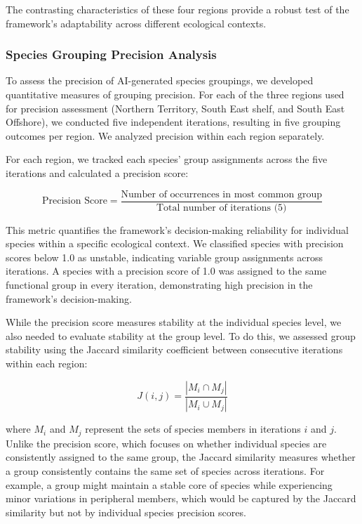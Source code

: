 The contrasting characteristics of these four regions provide a robust test of the framework's adaptability across different ecological contexts.

\subsubsection{Species Grouping Precision Analysis}

To assess the precision of AI-generated species groupings, we developed quantitative measures of grouping precision. For each of the three regions used for precision assessment (Northern Territory, South East shelf, and South East Offshore), we conducted five independent iterations, resulting in five grouping outcomes per region. We analyzed precision within each region separately.

For each region, we tracked each species' group assignments across the five iterations and calculated a precision score:

\[
\text{Precision Score} = \frac{\text{Number of occurrences in most common group}}{\text{Total number of iterations (5)}}
\]

This metric quantifies the framework's decision-making reliability for individual species within a specific ecological context. We classified species with precision scores below 1.0 as unstable, indicating variable group assignments across iterations. A species with a precision score of 1.0 was assigned to the same functional group in every iteration, demonstrating high precision in the framework's decision-making.

While the precision score measures stability at the individual species level, we also needed to evaluate stability at the group level. To do this, we assessed group stability using the Jaccard similarity coefficient between consecutive iterations within each region:

\[
J(i,j) = \frac{|M_{i} \cap M_{j}|}{|M_{i} \cup M_{j}|}
\]

where $M_{i}$ and $M_{j}$ represent the sets of species members in iterations $i$ and $j$. Unlike the precision score, which focuses on whether individual species are consistently assigned to the same group, the Jaccard similarity measures whether a group consistently contains the same set of species across iterations. For example, a group might maintain a stable core of species while experiencing minor variations in peripheral members, which would be captured by the Jaccard similarity but not by individual species precision scores.

